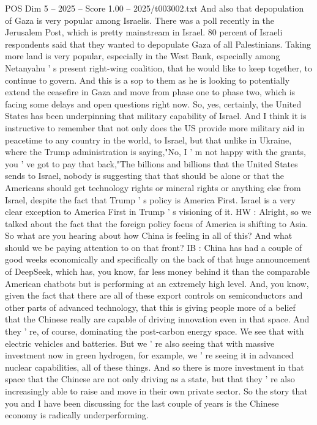 \begin{textsample}{POS Dim 5 – 2025 – Score 1.00 – 2025/t003002.txt}
And also that depopulation of Gaza is very popular among Israelis.
There was a poll recently in the Jerusalem Post, which is pretty mainstream in Israel. 80 percent of Israeli respondents said that they wanted to depopulate Gaza of all Palestinians.
Taking more land is very popular, especially in the West Bank, especially among Netanyahu ' s present right-wing coalition, that he would like to keep together, to continue to govern.
And this is a sop to them as he is looking to potentially extend the ceasefire in Gaza and move from phase one to phase two, which is facing some delays and open questions right now.
So, yes, certainly, the United States has been underpinning that military capability of Israel.
And I think it is instructive to remember that not only does the US provide more military aid in peacetime to any country in the world, to Israel, but that unlike in Ukraine, where the Trump administration is saying,"No, I ' m not happy with the grants, you ' ve got to pay that back,"The billions and billions that the United States sends to Israel, nobody is suggesting that that should be alone or that the Americans should get technology rights or mineral rights or anything else from Israel, despite the fact that Trump ' s policy is America First.
Israel is a very clear exception to America First in Trump ' s visioning of it.
HW : Alright, so we talked about the fact that the foreign policy focus of America is shifting to Asia.
So what are you hearing about how China is feeling in all of this?
And what should we be paying attention to on that front?
IB : China has had a couple of good weeks economically and specifically on the back of that huge announcement of DeepSeek, which has, you know, far less money behind it than the comparable American chatbots but is performing at an extremely high level.
And, you know, given the fact that there are all of these export controls on semiconductors and other parts of advanced technology, that this is giving people more of a belief that the Chinese really are capable of driving innovation even in that space.
And they ' re, of course, dominating the post-carbon energy space.
We see that with electric vehicles and batteries.
But we ' re also seeing that with massive investment now in green hydrogen, for example, we ' re seeing it in advanced nuclear capabilities, all of these things.
And so there is more investment in that space that the Chinese are not only driving as a state, but that they ' re also increasingly able to raise and move in their own private sector.
So the story that you and I have been discussing for the last couple of years is the Chinese economy is radically underperforming.

\end{textsample}
